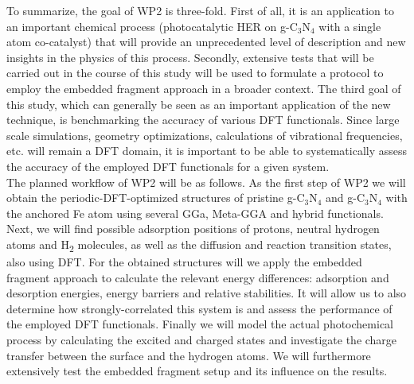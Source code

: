 \documentclass[a4paper,11pt,headings=normal]{scrartcl}
\begin{document}
\begin{itemize}
To summarize, the goal of WP2 is three-fold. First of all, it is an application to 
an important chemical process (photocatalytic HER on g-C$_3$N$_4$ with a single 
atom co-catalyst) that will provide an unprecedented level of description and new 
insights in the physics of this process. Secondly, extensive tests that will be 
carried out in the course of this study will be used to formulate a protocol to 
employ the embedded fragment approach in a broader context. The third goal of this 
study, which can generally be seen as an important application of the new 
technique, is benchmarking the accuracy of various DFT functionals. Since large 
scale simulations, geometry optimizations, calculations of vibrational 
frequencies, etc. will remain a DFT domain, it is important to be able to 
systematically assess the accuracy of the employed DFT functionals for a given 
system.\\
The planned workflow of WP2 will be as follows. As the first step of WP2 we will 
obtain the periodic-DFT-optimized structures of pristine g-C$_3$N$_4$ and 
g-C$_3$N$_4$ with the anchored Fe atom using several GGa, Meta-GGA and hybrid 
functionals. Next, we will find possible adsorption positions of protons, neutral 
hydrogen atoms and H\textsubscript{2} molecules, as well as the diffusion and 
reaction transition states, also using DFT. For the obtained structures will we 
apply the embedded fragment approach to calculate the relevant energy differences: 
adsorption and desorption energies, energy barriers and relative stabilities. It 
will allow us to also determine how strongly-correlated this system is and assess 
the performance of the employed DFT functionals. Finally we will model the actual 
photochemical process by calculating the excited and charged states and 
investigate the charge transfer between the surface and the hydrogen atoms. We 
will furthermore extensively test the embedded fragment setup and its influence 
on the results.\\
\newpage


\end{itemize}
\end{document}
